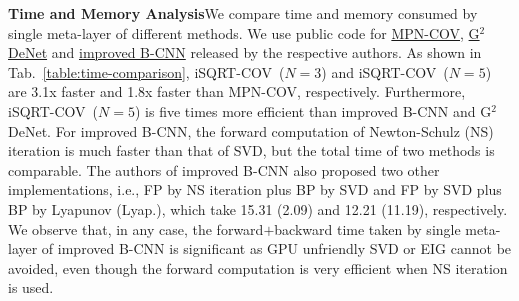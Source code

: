 \documentclass[10pt,twocolumn,letterpaper]{article}
\begin{document}
\vspace{4pt}\noindent\textbf{Time and Memory Analysis}\quad We  compare  time and memory consumed by  single meta-layer of different methods. We use  public code for \href{https://github.com/jiangtaoxie/MPN-COV-ConvNet}{MPN-COV},  \href{http://www.peihuali.org/publications/G2DeNet/G2DeNet-FGVC-v1.0.zip}{G$^{2}$DeNet} and \href{https://bitbucket.org/tsungyu/bcnn}{improved B-CNN} released by the respective authors. As shown in Tab.~\ref{table:time-comparison}, iSQRT-COV~($N=3$) and iSQRT-COV~($N=5$) are 3.1x faster and 1.8x faster than MPN-COV, respectively. Furthermore, iSQRT-COV~($N=5$) is  five  times more efficient than  improved B-CNN and G$^2$DeNet. For improved B-CNN, the forward computation of Newton-Schulz (NS) iteration is much faster than that of SVD, but the total time of two methods is comparable. The authors of improved B-CNN  also proposed two other implementations, i.e.,  FP by NS iteration plus BP by SVD and FP by SVD plus BP by Lyapunov (Lyap.), which take 15.31 (2.09) and 12.21 (11.19), respectively. We observe that, in any case, the forward$+$backward time taken by  single meta-layer of improved B-CNN is significant  as GPU unfriendly SVD or EIG cannot be avoided, even though the forward computation is very  efficient when NS iteration is used. 
\end{document}
